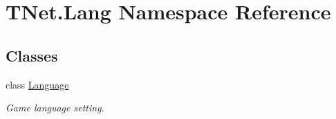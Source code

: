 \hypertarget{namespace_t_net_1_1_lang}{}\section{T\+Net.\+Lang Namespace Reference}
\label{namespace_t_net_1_1_lang}
\subsection*{Classes}
\begin{DoxyCompactItemize}
\item 
class \mbox{\hyperlink{class_t_net_1_1_lang_1_1_language}{Language}}
\begin{DoxyCompactList}\small\item\em Game language setting. \end{DoxyCompactList}\end{DoxyCompactItemize}
